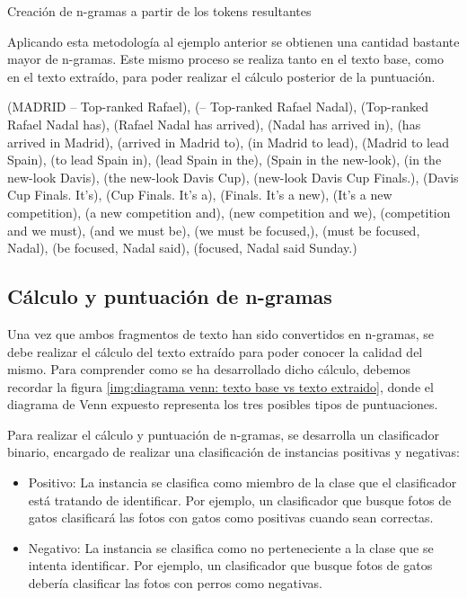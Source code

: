 \begin{codefloat}
  
  \caption{Creación de n-gramas a partir de los tokens resultantes}
  \label{cod:creacion de n-gramas a partir de los tokens resultantes}
\end{codefloat}

Aplicando esta metodología al ejemplo anterior se obtienen una cantidad bastante mayor de n-gramas. Este
mismo proceso se realiza tanto en el texto base, como en el texto extraído, para poder realizar el cálculo
posterior de la puntuación.

\begin{Schunk}
  \begin{Soutput}
(MADRID -- Top-ranked Rafael), (-- Top-ranked Rafael Nadal), 
(Top-ranked Rafael Nadal has), (Rafael Nadal has arrived), 
(Nadal has arrived in), (has arrived in Madrid), (arrived in Madrid to), 
(in Madrid to lead), (Madrid to lead Spain), (to lead Spain in), 
(lead Spain in the), (Spain in the new-look), (in the new-look Davis), 
(the new-look Davis Cup), (new-look Davis Cup Finals.), (Davis Cup Finals. It’s),
(Cup Finals. It’s a), (Finals. It’s a new), (It’s a new competition),
(a new competition and), (new competition and we), (competition and we must), 
(and we must be), (we must be focused,), (must be focused, Nadal),
(be focused, Nadal said), (focused, Nadal said Sunday.)
  \end{Soutput}
\end{Schunk}

\subsection{Cálculo y puntuación de n-gramas}
\label{subsec:calculo y puntuacion de n-gramas}

Una vez que ambos fragmentos de texto han sido convertidos en n-gramas, se debe realizar el cálculo del
texto extraído para poder conocer la calidad del mismo. Para comprender como se ha desarrollado dicho
cálculo, debemos recordar la figura \ref{img:diagrama venn: texto base vs texto extraido}, donde el 
diagrama de Venn expuesto representa los tres posibles tipos de puntuaciones.

Para realizar el cálculo y puntuación de n-gramas, se desarrolla un clasificador binario, encargado de 
realizar una clasificación de instancias positivas y negativas:

\begin{itemize}
  \item Positivo: La instancia se clasifica como miembro de la clase que el clasificador está tratando de 
  identificar. Por ejemplo, un clasificador que busque fotos de gatos clasificará las fotos con gatos como 
  positivas cuando sean correctas.
  \item Negativo: La instancia se clasifica como no perteneciente a la clase que se intenta identificar. 
  Por ejemplo, un clasificador que busque fotos de gatos debería clasificar las fotos con perros como 
  negativas.
\end{itemize}

